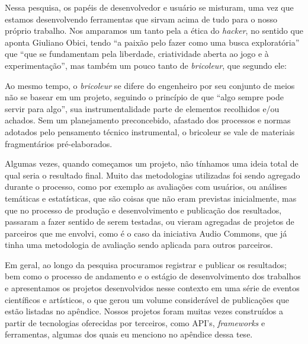 {%



Nessa pesquisa, os papéis de desenvolvedor e usuário se misturam, uma vez que estamos desenvolvendo ferramentas que sirvam acima de tudo para o nosso próprio trabalho. Nos amparamos um tanto pela a ética do \emph{hacker}, no sentido que aponta Giuliano Obici, tendo ``a paixão pelo fazer como uma busca exploratória'' que ``que se fundamentam pela liberdade, criatividade aberta ao jogo e à experimentação''\cite[p. 366]{Obici2014}, mas também um pouco tanto de \emph{bricoleur}, que segundo ele:
\begin{citacao}
Ao mesmo tempo, o \emph{bricoleur} se difere do engenheiro por seu conjunto de meios não se basear em um projeto, seguindo o princípio de que “algo sempre pode servir para algo”, sua instrumentalidade parte de elementos recolhidos e/ou achados. Sem um planejamento preconcebido, afastado dos processos e normas adotados pelo pensamento técnico instrumental, o bricoleur se vale de materiais fragmentários pré-elaborados. \cite[366]{Obici2014}
\end{citacao}

Algumas vezes, quando começamos um projeto, não tínhamos uma ideia total de qual seria o resultado final. Muito das metodologias utilizadas foi sendo agregado durante o processo, como por exemplo as avaliações com usuários, ou análises temáticas e estatísticas, que são coisas que não eram previstas inicialmente, mas que no processo de produção e desenvolvimento e publicação dos resultados, passaram a fazer sentido de serem testadas, ou vieram agregadas de projetos de parceiros que me envolvi, como é o caso da iniciativa Audio Commons, que já tinha uma metodologia de avaliação sendo aplicada para outros parceiros. 


Em geral, ao longo da pesquisa procuramos registrar e publicar os resultados; bem como o processo de andamento e o estágio de  desenvolvimento dos trabalhos e apresentamos os projetos desenvolvidos nesse contexto em uma série de eventos científicos e artísticos, o que gerou um volume considerável de publicações que estão listadas no apêndice. Nossos projetos foram muitas vezes construídos a partir de tecnologias oferecidas por terceiros, como API's, \emph{frameworks} e ferramentas, algumas dos quais eu menciono no apêndice dessa tese. 


}
